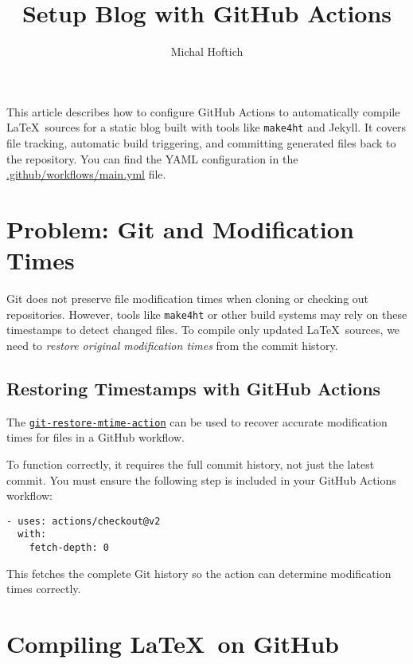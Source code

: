 \documentclass{article}
\title{Setup Blog with GitHub Actions}
\author{Michal Hoftich}
\def\makeht{\texttt{make4ht}}
\begin{document}
\maketitle

This article describes how to configure GitHub Actions to automatically compile \LaTeX\ sources
for a static blog built with tools like \makeht{} and Jekyll. It covers file tracking,
automatic build triggering, and committing generated files back to the repository.
You can find the YAML configuration in the
\href{https://github.com/michal-h21/testblog/blob/main/.github/workflows/main.yml}{.github/workflows/main.yml}
file.


\tableofcontents

\section{Problem: Git and Modification Times}

Git does not preserve file modification times when cloning or checking out repositories.  
However, tools like \makeht{} or other build systems may rely on these timestamps to detect changed files.  
To compile only updated \LaTeX\ sources, we need to \textit{restore original modification times}
from the commit history.

\subsection{Restoring Timestamps with GitHub Actions}

The 
\href{https://github.com/chetan/git-restore-mtime-action}{\texttt{git-restore-mtime-action}} 
can be used to recover accurate modification times for files in a GitHub workflow.

To function correctly, it requires the full commit history, not just the latest commit.
You must ensure the following step is included in your GitHub Actions workflow:

\begin{verbatim}
- uses: actions/checkout@v2
  with:
    fetch-depth: 0
\end{verbatim}

This fetches the complete Git history so the action can determine modification times correctly.

\section{Compiling \LaTeX\ on GitHub}
\end{document}
